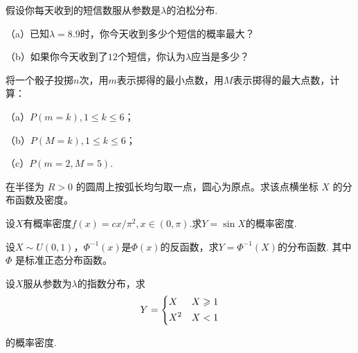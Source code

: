 \begin{exercise}[计数结果与参数的区别]\label{q:Y3.24}
假设你每天收到的短信数服从参数是$\lambda$的泊松分布.

（a）已知$\lambda=8.9$时，你今天收到多少个短信的概率最大？

（b）如果你今天收到了$12$个短信，你认为$\lambda$应当是多少？\par{}\end{exercise}

\begin{exercise}[骰子样本的最大最小值]\label{q:Y3.25}
将一个骰子投掷$n$次，用$m$表示掷得的最小点数，用$M$表示掷得的最大点数，计算：

（a）$P(m=k),1\leqslant k\leqslant 6$；

（b）$P(M=k),1\leqslant k\leqslant 6$；

（c）$P(m=2,M=5)$.\par{}\end{exercise}

\begin{exercise}[圆周投影的反正弦密度]\label{q:Y3.26}
在半径为 $R>0$ 的圆周上按弧长均匀取一点，圆心为原点。求该点横坐标 $X$ 的分布函数及密度。\par{}\end{exercise}

\begin{exercise}[正弦变换的两条分支]\label{q:Y3.28}
设$X$有概率密度$f(x)=cx/\pi^2,x\in (0,\pi)$.求$Y=\sin X$的概率密度.\par{}\end{exercise}

\begin{exercise}[逆分布函数生成正态数]\label{q:Y3.29}
设$X \sim  U(0,1)$，$\Phi^{-1}(x)$是$\Phi(x)$的反函数，求$Y=\Phi^{-1} (X)$的分布函数. 其中 $\Phi$ 是标准正态分布函数。\par{}\end{exercise}

\begin{exercise}[分段单调变换]\label{q:Y3.31}
设$X$服从参数为$\lambda$的指数分布，求
\[Y = \left\{ \begin{gathered}
  X \hfill \quad X\geqslant 1\\
  {X^2} \hfill \quad  X<1\\ 
\end{gathered}  \right.\]

的概率密度.\par{}\end{exercise}

